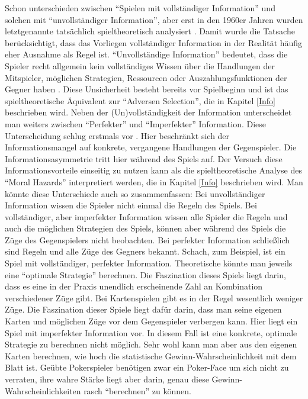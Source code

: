 Schon \textcite{Morgenstern1944} unterschieden zwischen "`Spielen mit vollständiger Information"' und solchen mit "`unvollständiger Information"', aber erst in den 1960er Jahren wurden letztgenannte tatsächlich spieltheoretisch analysiert \parencite[S. 137]{Harsanyi1994}. Damit wurde die Tatsache berücksichtigt, dass das Vorliegen vollständiger Information in der Realität häufig eher Ausnahme als Regel ist. "`Unvollständige Information"' bedeutet, dass die Spieler recht allgemein kein vollständiges Wissen über die Handlungen der Mitspieler, möglichen Strategien, Ressourcen oder Auszahlungsfunktionen der Gegner haben \parencite[S. 137]{Harsanyi1994}. Diese Unsicherheit besteht bereits vor Spielbeginn und ist das spieltheoretische Äquivalent zur "`Adversen Selection"', die in Kapitel \ref{Info} beschrieben wird. Neben der (Un)vollständigkeit der Information unterscheidet man weiters zwischen "`Perfekter"' und "`Imperfekter"' Information. Diese Unterscheidung schlug \textcite{Selten1965} erstmals vor \parencite[S. 166]{Nash1994}. Hier beschränkt sich der Informationsmangel auf konkrete, vergangene Handlungen der Gegenspieler.  Die Informationsasymmetrie tritt hier während des Spiels auf. Der Versuch diese Informationsvorteile einseitig zu nutzen kann als die spieltheoretische Analyse des "`Moral Hazards"' interpretiert werden, die in Kapitel \ref{Info} beschrieben wird. Man könnte diese Unterschiede auch so zusammenfassen: Bei unvollständiger Information wissen die Spieler nicht einmal die Regeln des Spiels. Bei vollständiger, aber imperfekter Information wissen alle Spieler die Regeln und auch die möglichen Strategien des Spiels, können aber während des Spiels die Züge des Gegenspielers nicht beobachten. Bei perfekter Information schließlich sind Regeln und alle Züge des Gegners bekannt. Schach, zum Beispiel, ist ein Spiel mit vollständiger, perfekter Information. Theoretische könnte man jeweils eine "`optimale Strategie"' berechnen. Die Faszination dieses Spiels liegt darin, dass es eine in der Praxis unendlich erscheinende Zahl an Kombination verschiedener Züge gibt. Bei Kartenspielen gibt es in der Regel wesentlich weniger Züge. Die Faszination dieser Spiele liegt dafür darin, dass man seine eigenen Karten und möglichen Züge vor dem Gegenspieler verbergen kann. Hier liegt ein Spiel mit imperfekter Information vor. In diesem Fall ist eine konkrete, optimale Strategie zu berechnen nicht möglich. Sehr wohl kann man aber aus den eigenen Karten berechnen, wie hoch die statistische Gewinn-Wahrscheinlichkeit mit dem Blatt ist. Geübte Pokerspieler benötigen zwar ein Poker-Face um sich nicht zu verraten, ihre wahre Stärke liegt aber darin, genau diese Gewinn-Wahrscheinlichkeiten rasch "`berechnen"' zu können.

